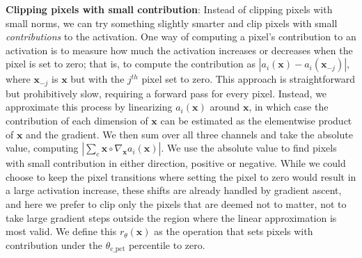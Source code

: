 \documentclass{article}
\newcommand{\x}{\mathbf{x}}
\begin{document}
{\bf Clipping pixels with small contribution}: Instead of clipping pixels with small norms, we can try something slightly smarter and clip pixels with small \emph{contributions} to the activation. One way of computing a pixel's contribution to an activation is to measure how much the activation increases or decreases when the pixel is set to zero; that is, to compute the contribution as $|a_i(\x) - a_i(\x_{-j})|$, where $\x_{-j}$ is $\x$ but with the $j^{th}$ pixel set to zero. This approach is straightforward but prohibitively slow, requiring a forward pass for every pixel. Instead, we approximate this process by linearizing $a_i(\x)$ around $\x$, in which case the contribution of each dimension of $\x$ can be estimated as the elementwise product of $\x$ and the gradient. We then sum over all three channels and take the absolute value, computing  $\left|\sum_c \x \circ \nabla_\x a_i(\x)\right|$. We use the absolute value to find pixels with small contribution in either direction, positive or negative. While we could choose to keep the pixel transitions where setting the pixel to zero would result in a large activation increase, these shifts are already handled by gradient ascent, and here we prefer to clip only the pixels that are deemed not to matter, not to take large gradient steps outside the region where the linear approximation is most valid. We define this $r_\theta(\x)$ as the operation that sets pixels with contribution under the $\theta_{\mathrm{c\_pct}}$ percentile to zero.



\end{document}
